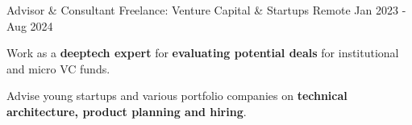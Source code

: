 \begin{cventries}

  \cventry
    {Advisor \& Consultant} %
    {Freelance: Venture Capital \& Startups} %
    {Remote} %
    {Jan 2023 - Aug 2024} %
    {
      \begin{cvitems} %
      \item {Work as a \textbf{deeptech expert} for \textbf{evaluating potential deals} for institutional and micro VC funds.}
      \item {Advise young startups and various portfolio companies on \textbf{technical architecture, product planning and hiring}.}
      \end{cvitems}
    }



\end{cventries}
